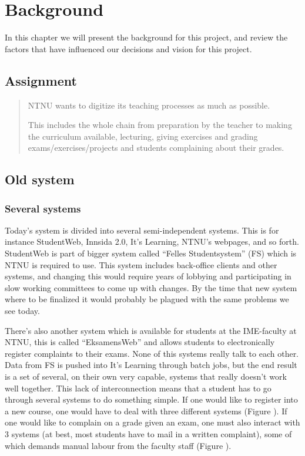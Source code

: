 \chapter{Background}
In this chapter we will present the background for this project, and review the factors that have
influenced our decisions and vision for this project.

\section{Assignment}

\begin{quote}
   NTNU wants to digitize its teaching processes as much as possible.\newline

   This includes the whole chain from preparation by the teacher to making the curriculum available, lecturing, giving exercises and grading exams/exercises/projects and students complaining about their grades.
\end{quote}

\section{Old system}
\subsection{Several systems}
Today's system is divided into several semi-independent systems. This is for instance StudentWeb, Innsida 2.0, It's Learning, NTNU's webpages, and so forth. 
StudentWeb is part of bigger system called ``Felles Studentsystem'' (FS) which is NTNU is required to use. This system includes back-office clients and other systems, and changing this
would require years of lobbying and participating in slow working committees to come up with changes. By the time that new system where to be finalized it would probably be plagued with the same problems we see today.

\noindent %
 There's also another system which is available for students at the IME-faculty at NTNU, this is called ``EksamensWeb'' and allows students to electronically register complaints to 
 their exams. None of this systems really talk to each other. Data from FS is pushed into It's Learning through batch jobs, but the end result is a set of several, on their own very capable, systems that really doesn't work well together.  
 This lack of interconnection means that a student has to go through several systems to do something simple. If one would like to register into a new course, one would have to deal with three different systems (Figure \pageref{fig:Register-old}). If one would like to complain on a grade given an exam, one must also interact with 3 systems (at best, most students have to mail in a written complaint), some of which demands manual labour from the faculty staff (Figure \pageref{fig:Complain-old}).

